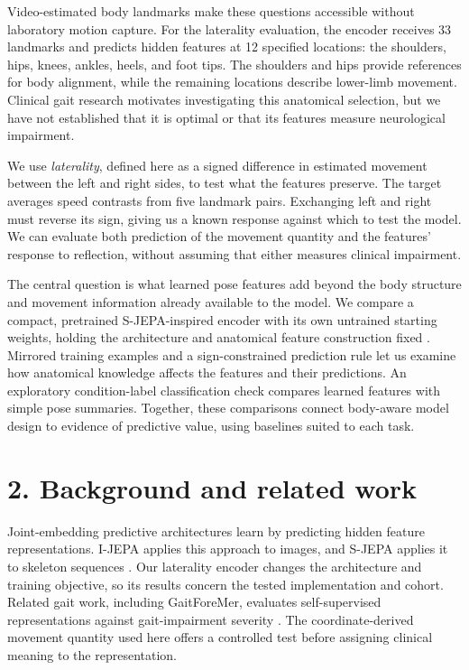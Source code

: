 \documentclass{article}
\begin{document}
Video-estimated body landmarks make these questions accessible without
laboratory motion capture. For the laterality evaluation, the encoder
receives 33 landmarks and predicts hidden features at 12 specified
locations: the shoulders, hips, knees, ankles, heels, and foot tips. The
shoulders and hips provide references for body alignment, while the
remaining locations describe lower-limb movement. Clinical gait research
motivates investigating this anatomical selection, but we have not
established that it is optimal or that its features measure neurological
impairment.

We use \emph{laterality}, defined here as a signed difference in
estimated movement between the left and right sides, to test what the
features preserve. The target averages speed contrasts from five
landmark pairs. Exchanging left and right must reverse its sign, giving
us a known response against which to test the model. We can evaluate
both prediction of the movement quantity and the features' response to
reflection, without assuming that either measures clinical impairment.

The central question is what learned pose features add beyond the body
structure and movement information already available to the model. We
compare a compact, pretrained S-JEPA-inspired encoder with its own
untrained starting weights, holding the architecture and anatomical
feature construction fixed \citep{abdelfattah2024sjepa}. Mirrored
training examples and a sign-constrained prediction rule let us examine
how anatomical knowledge affects the features and their predictions. An
exploratory condition-label classification check compares learned
features with simple pose summaries. Together, these comparisons connect
body-aware model design to evidence of predictive value, using baselines
suited to each task.

\section{2. Background and related
work}\label{background-and-related-work}

Joint-embedding predictive architectures learn by predicting hidden
feature representations. I-JEPA applies this approach to images, and
S-JEPA applies it to skeleton sequences
\citep{assran2023ijepa, abdelfattah2024sjepa}. Our laterality encoder
changes the architecture and training objective, so its results concern
the tested implementation and cohort. Related gait work, including
GaitForeMer, evaluates self-supervised representations against
gait-impairment severity \citep{endo2022gaitforemer}. The
coordinate-derived movement quantity used here offers a controlled test
before assigning clinical meaning to the representation.
\end{document}
